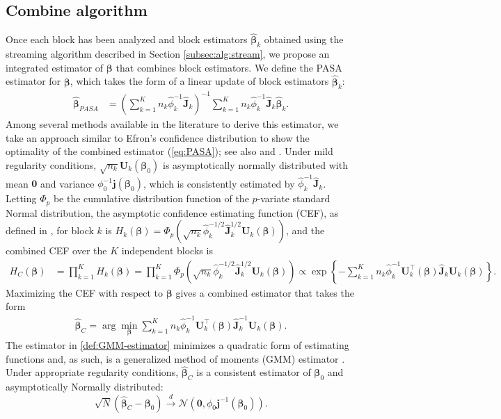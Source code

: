 \documentclass[12pt]{article}
\newcommand{\bJ}{\boldsymbol{J}}
\newcommand{\bj}{\boldsymbol{j}}
\newcommand{\bU}{\boldsymbol{U}}
\newcommand{\bbeta}{\boldsymbol{\beta}}
\begin{document}
\subsection{Combine algorithm}
\label{subsec:alg:combine}
Once each block has been analyzed and block estimators $\widehat{\bbeta}_k$ obtained using the streaming algorithm described in Section \ref{subsec:alg:stream}, we propose an integrated estimator of $\bbeta$ that combines block estimators. We define the PASA estimator for $\bbeta$, which takes the form of a linear update of block estimators $\widehat{\bbeta}_k$:
\begin{align}\label{eq:PASA}
\widehat{\bbeta}_{PASA} &=\left( \sum \limits_{k=1}^K 
n_k \widehat{\phi}^{-1}_k \widehat{\bJ}_k
\right)^{-1} 
\sum \limits_{k=1}^K n_k \widehat{\phi}^{-1}_k \widehat{\bJ}_k \widehat{\bbeta}_k.
\end{align}
Among several methods available in the literature to derive this estimator, we take an approach similar to Efron's confidence distribution \cite{Efron1993} to show the optimality  of the combined estimator (\ref{eq:PASA}); see also \cite{Singh-Xie-Strawderman} and \cite{Xie-Singh}. Under mild regularity conditions, $\sqrt{n_k} \bU_k(\bbeta_0)$ is asymptotically normally distributed with mean $\boldsymbol{0}$ and variance $\phi_0^{-1}\bj(\bbeta_0)$, which is consistently estimated by $\widehat{\phi}_k^{-1} \widehat{\bJ}_k$. Letting $\Phi_p$ be the cumulative distribution function of the $p$-variate standard Normal distribution, the asymptotic confidence estimating function (CEF), as defined in \cite{Hector-Song-JASA}, for block $k$ is $H_k(\bbeta)=\Phi_p ( \sqrt{n_k} \widehat{\phi}^{-1/2}_k \widehat{\bJ}^{1/2}_k \bU_k(\bbeta) )$, and the combined CEF over the $K$ independent blocks is
\begin{align*}
H_C(\bbeta)
&=\prod \limits_{k=1}^K H_k(\bbeta)=\prod \limits_{k=1}^K \Phi_p \left( \sqrt{n_k} \widehat{\phi}^{-1/2}_k \widehat{\bJ}^{1/2}_k  \bU_k(\bbeta) \right) \propto \exp \left\{ -\sum \limits_{k=1}^K n_k \widehat{\phi}^{-1}_k \bU^\top_k(\bbeta) \widehat{\bJ}_k\bU_k(\bbeta) \right\}.
\end{align*}
Maximizing the CEF with respect to $\bbeta$ gives a combined estimator that takes the form
\begin{align}
\widehat{\bbeta}_{C}= \arg \min \limits_{\bbeta} \sum \limits_{k=1}^K n_k \widehat{\phi}^{-1}_k \bU^\top_k(\bbeta) \widehat{\bJ}^{-1}_k \bU_k(\bbeta).
\label{def:GMM-estimator}
\end{align}
The estimator in \eqref{def:GMM-estimator} minimizes a quadratic form of estimating functions and, as such, is a generalized method of moments (GMM) estimator \cite{Hansen}. Under appropriate regularity conditions, $\widehat{\bbeta}_C$ is a consistent estimator of $\bbeta_0$ and asymptotically Normally distributed: $$
\sqrt{N} (\widehat{\bbeta}_C -\bbeta_0) \stackrel{d}{\rightarrow} \mathcal{N}\left(\boldsymbol{0}, {\phi}_0 \bm{j}^{-1}(\bbeta_{0}) \right).
$$ 
\end{document}
